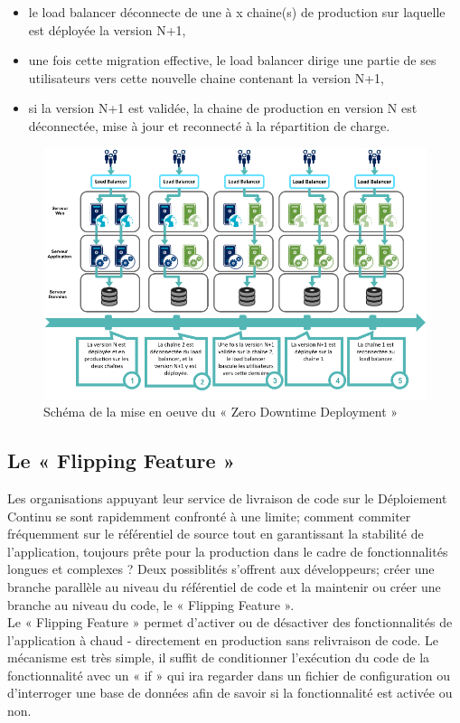         \begin{itemize}
          \item le load balancer déconnecte de une à x chaine(s) de production sur laquelle est déployée la version N+1,
          \item une fois cette migration effective, le load balancer dirige une partie de ses utilisateurs vers cette nouvelle chaine contenant la version N+1,
          \item si la version N+1 est validée, la chaine de production en version N est déconnectée, mise à jour et reconnecté à la répartition de charge.\\
        \end{itemize}

        \begin{figure}
          \begin{center}
            \includegraphics[scale=0.6]{images/LoadBalancer.png}
          \end{center}
          \caption{Schéma de la mise en oeuve du « Zero Downtime Deployment »}
          \label{LoadBalancer}
        \end{figure}

      \subsection{Le « Flipping Feature »}
      Les organisations appuyant leur service de livraison de code sur le Déploiement Continu se sont rapidemment confronté à une limite; comment commiter fréquemment sur le référentiel de source tout en garantissant la stabilité de l’application, toujours prête pour la production dans le cadre de fonctionnalités longues et complexes ? Deux possiblités s'offrent aux développeurs; créer une branche parallèle au niveau du référentiel de code et la maintenir ou créer une branche au niveau du code, le « Flipping Feature ».\\
      Le « Flipping Feature » permet d'activer ou de désactiver des fonctionnalités de l'application à chaud - directement en production sans relivraison de code. Le mécanisme est très simple, il suffit de conditionner l'exécution du code de la fonctionnalité avec un « if » qui ira regarder dans un fichier de configuration ou d'interroger une base de données afin de savoir si la fonctionnalité est activée ou non.\\

